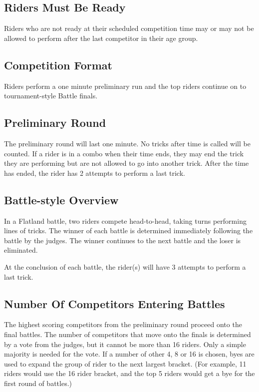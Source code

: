 \subsection{Riders Must Be Ready}

Riders who are not ready at their scheduled competition time may or may not be allowed to perform after the last competitor in their age group.

\subsection{Competition Format}
Riders perform a one minute preliminary run and the top riders continue on to tournament-style Battle finals.

\subsection{Preliminary Round}

The preliminary round will last one minute.
No tricks after time is called will be counted.
If a rider is in a combo when their time ends, they may end the trick they are performing but are not allowed to go into another trick.
After the time has ended, the rider has 2 attempts to perform a last trick.

\subsection{Battle-style Overview}
In a Flatland battle, two riders compete head-to-head, taking turns performing lines of tricks.
The winner of each battle is determined immediately following the battle by the judges.
The winner continues to the next battle and the loser is eliminated.

At the conclusion of each battle, the rider(s) will have 3 attempts to perform a last trick.

\subsection{Number Of Competitors Entering Battles}
The highest scoring competitors from the preliminary round proceed onto the final battles.
The number of competitors that move onto the finals is determined by a vote from the judges, but it cannot be more than 16 riders.
Only a simple majority is needed for the vote.
If a number of other 4, 8 or 16 is chosen, byes are used to expand the group of rider to the next largest bracket.
(For example, 11 riders would use the 16 rider bracket, and the top 5 riders would get a bye for the first round of battles.)

